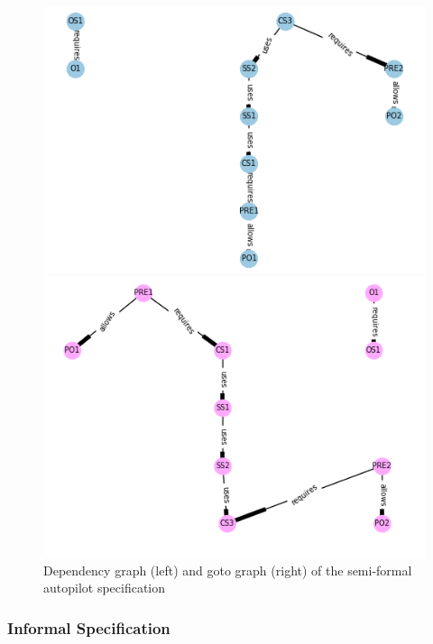 \begin{figure}[H]
\centering
\begin{minipage}{0.45\textwidth}
\centering
\includegraphics[scale=0.4]{Figures/fullexample/sfdp.png}
\end{minipage}\hfill
\begin{minipage}{0.45\textwidth}
\centering
\includegraphics[scale=0.4]{Figures/fullexample/sfgoto.png}
\end{minipage}
\caption{Dependency graph (left) and goto graph (right) of the semi-formal autopilot specification\label{fig:sfdepgoto}}
\end{figure}

\subsubsection{Informal Specification}

